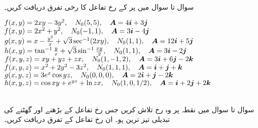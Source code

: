 \\
سوال  تا سوال  میں  پر  کے رخ تفاعل کا رخی تفرق دریافت کریں۔

$f(x,y)=2xy-3y^2,\quad N_0(5,5),\quad \kvec{A}=4\ai+3\aj$
$f(x,y)=2x^2+y^2,\quad N_0(-1,1),\quad \kvec{A}=3\ai-4\aj$
$g(x,y)=x-\frac{y^2}{x}+\sqrt{3}\sec^{-1}(2xy),\quad N_0(1,1),\quad \kvec{A}=12\ai+5\aj$
$h(x,y)=\tan^{-1}\frac{y}{x}+\sqrt{3}\sin^{-1}\frac{xy}{2},\quad N_0(1,1),\quad \kvec{A}=3\ai-2\aj$
$f(x,y,z)=xy+yz+zx,\quad N_0(1,-1,2),\quad \kvec{A}=3\ai+6\aj-2\ak$
$f(x,y,z)=x^2+2y^2-3z^2,\quad N_0(1,1,1),\quad \kvec{A}=\ai+\aj+\ak$
$g(x,y,z)=3e^x\cos yz,\quad N_0(0,0,0),\quad \kvec{A}=2\ai+\aj-2\ak$
$h(x,y,z)=\cos xy+e^{yz}+\ln zx,\quad N_0(1,0,1/2),\quad \kvec{A}=\ai+2\aj+2\ak$

\\
سوال  تا سوال  میں نقطہ   پر  وہ رخ تلاش کریں جس رخ تفاعل کے بڑھنے اور گھٹنے کی تبدیلی تیز ترین ہو۔ ان رخ تفاعل کے تفرق دریافت کریں۔

